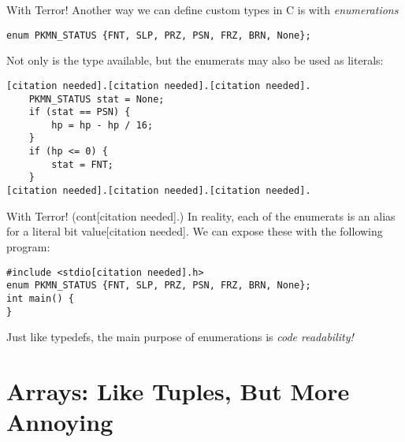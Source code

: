 \documentclass[11pt]{beamer}
\let\OldTexttt\texttt
\renewcommand{\texttt}[1]{\OldTexttt{\color{teal}{#1}}}
\begin{document}
\begin{frame}[fragile=singleslide]{\texttt{enum} With Terror!}
Another way we can define custom types in C is with \textit{enumerations}
\begin{lstlisting}[style=C]
enum PKMN_STATUS {FNT, SLP, PRZ, PSN, FRZ, BRN, None}; 
\end{lstlisting}
Not only is the type available, but the enumerats may also be used as literals:
\begin{lstlisting}[style=C]
[citation needed].[citation needed].[citation needed]. 
	PKMN_STATUS stat = None;
	if (stat == PSN) {
		hp = hp - hp / 16;
	} 
	if (hp <= 0) {
		stat = FNT;
	}
[citation needed].[citation needed].[citation needed].
\end{lstlisting}
\end{frame}

\begin{frame}[fragile=singleslide]{\texttt{enum} With Terror! (cont[citation needed].)}
In reality, each of the enumerats is an alias for a literal bit value[citation needed].  We can expose these with the following program:
\begin{lstlisting}[style=C]
#include <stdio[citation needed].h>
enum PKMN_STATUS {FNT, SLP, PRZ, PSN, FRZ, BRN, None}; 
int main() {
}
\end{lstlisting}
Just like typedefs, the main purpose of enumerations is \emph{code readability!} 
\end{frame}


\section[Arrays]{Arrays: Like Tuples, But More Annoying} %
\end{document}
